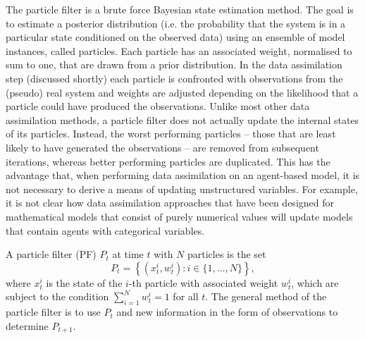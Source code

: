 The particle filter is a brute force Bayesian state estimation method. The goal is to estimate a posterior distribution (i.e. the probability that the system is in a particular state conditioned on the observed data) using an ensemble of model instances, called particles. Each particle has an associated weight, normalised to sum to one, that are drawn from a prior distribution. In the data assimilation step (discussed shortly) each particle is confronted with observations from the (pseudo) real system and weights are adjusted depending on the likelihood that a particle could have produced the observations. Unlike most other data assimilation methods, a particle filter does not actually update the internal states of its particles. Instead, the worst performing particles -- those that are least likely to have generated the observations -- are removed from subsequent iterations, whereas better performing particles are duplicated. This has the advantage that, when performing data assimilation on an agent-based model, it is not necessary to derive a means of updating unstructured variables. For example, it is not clear how data assimilation approaches that have been designed for mathematical models that consist of purely numerical values will update models that contain agents with categorical  variables.

A particle filter (PF) $P_t$ at time $t$ with $N$ particles is the set 
\begin{equation}
P_t = \left\{ (x_t^i, w_t^i) : i \in \{1,\dots,N\} \right\},
\end{equation}
where $x_t^i$ is the state of the $i$-th particle with associated weight $w_t^i$, which are subject to the condition $\sum_{i=1}^N w_t^i = 1$ for all $t$. The general method of the particle filter is to use $P_t$ and new information in the form of observations to determine $P_{t+1}$. 


